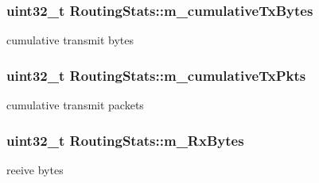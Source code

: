 \subsubsection[{\texorpdfstring{m\+\_\+cumulative\+Tx\+Bytes}{m_cumulativeTxBytes}}]{\setlength{\rightskip}{0pt plus 5cm}uint32\+\_\+t Routing\+Stats\+::m\+\_\+cumulative\+Tx\+Bytes\hspace{0.3cm}{\ttfamily [private]}}\hypertarget{classRoutingStats_a9c4bbf90ae33d7d3ccf40a6834994636}{}\label{classRoutingStats_a9c4bbf90ae33d7d3ccf40a6834994636}


cumulative transmit bytes 

\subsubsection[{\texorpdfstring{m\+\_\+cumulative\+Tx\+Pkts}{m_cumulativeTxPkts}}]{\setlength{\rightskip}{0pt plus 5cm}uint32\+\_\+t Routing\+Stats\+::m\+\_\+cumulative\+Tx\+Pkts\hspace{0.3cm}{\ttfamily [private]}}\hypertarget{classRoutingStats_a2e7c09facbabbd2630873038db1d4be1}{}\label{classRoutingStats_a2e7c09facbabbd2630873038db1d4be1}


cumulative transmit packets 

\subsubsection[{\texorpdfstring{m\+\_\+\+Rx\+Bytes}{m_RxBytes}}]{\setlength{\rightskip}{0pt plus 5cm}uint32\+\_\+t Routing\+Stats\+::m\+\_\+\+Rx\+Bytes\hspace{0.3cm}{\ttfamily [private]}}\hypertarget{classRoutingStats_a13d3c32bff18dc6eeddf28641b8b43da}{}\label{classRoutingStats_a13d3c32bff18dc6eeddf28641b8b43da}


reeive bytes 

